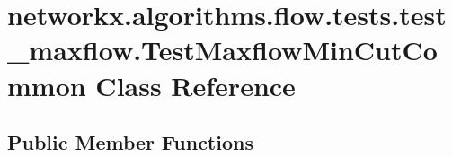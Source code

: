\hypertarget{classnetworkx_1_1algorithms_1_1flow_1_1tests_1_1test__maxflow_1_1TestMaxflowMinCutCommon}{}\section{networkx.\+algorithms.\+flow.\+tests.\+test\+\_\+maxflow.\+Test\+Maxflow\+Min\+Cut\+Common Class Reference}
\label{classnetworkx_1_1algorithms_1_1flow_1_1tests_1_1test__maxflow_1_1TestMaxflowMinCutCommon}
\subsection*{Public Member Functions}
